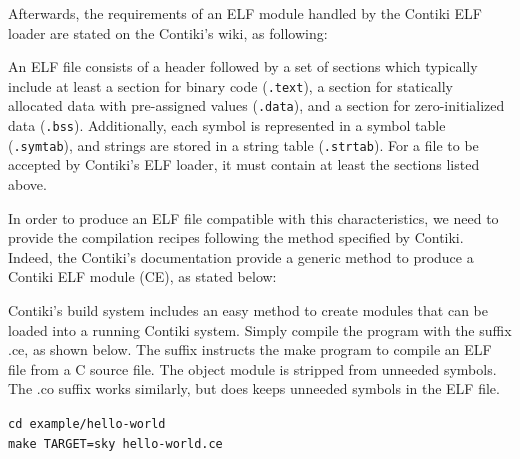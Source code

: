 
Afterwards, the requirements of an ELF module handled by the Contiki ELF loader are stated on the Contiki's wiki, as following:

\begin{citeverbatim}
	An ELF file consists of a header followed by a set of sections which typically include at least a section for binary code (\texttt{.text}), a section for statically allocated data with pre-assigned values (\texttt{.data}), and a section for zero-initialized data (\texttt{.bss}).
	Additionally, each symbol is represented in a symbol table (\texttt{.symtab}), and strings are stored in a string table (\texttt{.strtab}). 
	For a file to be accepted by Contiki's ELF loader, it must contain at least the sections listed above. 
\end{citeverbatim}

In order to produce an ELF file compatible with this characteristics, we need to provide the compilation recipes following the method specified by Contiki.
Indeed, the Contiki's documentation provide a generic method to produce a Contiki ELF module (CE), as stated below:

\begin{citeverbatim}
	Contiki's build system includes an easy method to create modules that can be loaded into a running Contiki system.
	Simply compile the program with the suffix .ce, as shown below. 
	The suffix instructs the make program to compile an ELF file from a C source file. 
	The object module is stripped from unneeded symbols. 
	The .co suffix works similarly, but does keeps unneeded symbols in the ELF file. 
	
	\texttt{cd example/hello-world} \\
	\texttt{make TARGET=sky hello-world.ce}
\end{citeverbatim}

